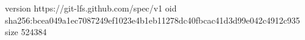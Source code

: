 version https://git-lfs.github.com/spec/v1
oid sha256:bcea049a1ec7087249ef1023e4b1eb11278dc40fbcac41d3d99e042c4912c935
size 524384
